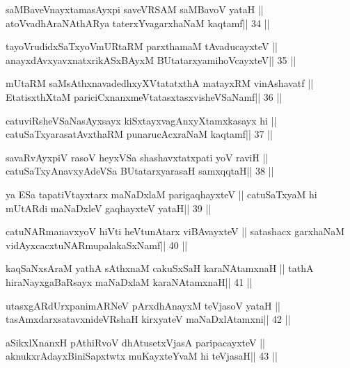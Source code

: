 \begin{shl}
saMBaveV\s nayxtamasAyxpi saveVRSAM saMBavoV yataH ||
atoV\s vadhAraNAthARya taterxYvagarxhaNaM kaqtamf\hfill || 34 ||
\end{shl}

\begin{shl}
tayoVrudidxSaTxyoVmURtaRM parxthamaM tAvaducayxteV ||
anayxdAvxyavxnatxrikASxBAyxM BUtatarxyamihoVcayxteV\hfill || 35 ||
\end{shl}

\begin{shl}
mUtaRM saMsAthxnavadedhxyXVtatatxthA matayxRM vinAshavatf ||
EtatisxthXtaM pariciCxnanxmeVtatasxtasxvisheVSaNamf\hfill || 36 ||
\end{shl}

\begin{shl}
catuviRsheVSaNasAyxsayx kiSxtayxvagAnxyXtamxkasayx hi ||
catuSaTxyarasatAvxthaRM punarucAcxraNaM kaqtamf\hfill || 37 ||
\end{shl}

\begin{shl}
savaRvAyxpiV rasoV heyxVSa shashavxtatxpati yoV raviH ||
catuSaTxyAnavxyAdeVSa BUtatarxyarasaH samxqqtaH\hfill || 38 ||
\end{shl}

\begin{shl}
ya ESa tapatiVtayxtarx maNaDxlaM parigaqhayxteV ||
catuSaTxyaM hi mUtARdi maNaDxleV gaqhayxteV yataH\hfill || 39 ||
\end{shl}

\begin{shl}
catuNARmanavxyoV hiVti heVtunA\s tarx viBAvayxteV ||
satashacx garxhaNaM vidAyxcacxtuNARmupalakaSxNamf\hfill || 40 ||
\end{shl}

\begin{shl}
kaqSaNxsAraM yathA sAthxnaM cakuSxSaH karaNAtamxnaH ||
tathA hiraNayxgaBaRsayx maNaDxlaM karaNAtamxnaH\hfill || 41 ||
\end{shl}

\begin{shl}
utasxgARdUrxpanimARNeV pArxdhAnayxM teVjasoV yataH ||
tasAmxdarxsatavxnideVRshaH kirxyateV maNaDxlAtamxni\hfill || 42 ||
\end{shl}

\begin{shl}
aSikxlXnanxH pAthiRvoV dhAtusetxVjasA paripacayxteV ||
aknukxrAdayxBiniSapxtwtx muKayxteYvaM hi teVjasaH\hfill || 43 ||
\end{shl}

